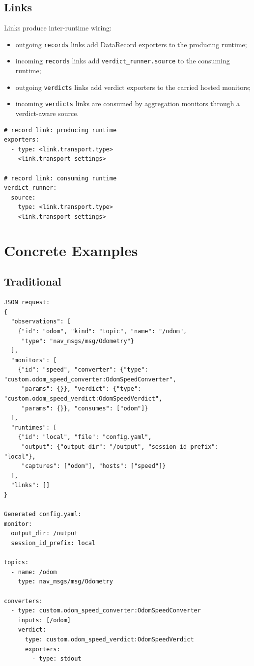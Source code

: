 \documentclass[11pt]{article}
\begin{document}
\subsection{Links}

Links produce inter-runtime wiring:

\begin{itemize}
  \item outgoing \texttt{records} links add DataRecord exporters to the
        producing runtime;
  \item incoming \texttt{records} links add \texttt{verdict\_runner.source}
        to the consuming runtime;
  \item outgoing \texttt{verdicts} links add verdict exporters to the carried
        hosted monitors;
  \item incoming \texttt{verdicts} links are consumed by aggregation monitors
        through a verdict-aware source.
\end{itemize}

\begin{verbatim}
# record link: producing runtime
exporters:
  - type: <link.transport.type>
    <link.transport settings>

# record link: consuming runtime
verdict_runner:
  source:
    type: <link.transport.type>
    <link.transport settings>
\end{verbatim}

\clearpage
\section{Concrete Examples}

\subsection{Traditional}

\begin{verbatim}
JSON request:
{
  "observations": [
    {"id": "odom", "kind": "topic", "name": "/odom",
     "type": "nav_msgs/msg/Odometry"}
  ],
  "monitors": [
    {"id": "speed", "converter": {"type": "custom.odom_speed_converter:OdomSpeedConverter",
     "params": {}}, "verdict": {"type": "custom.odom_speed_verdict:OdomSpeedVerdict",
     "params": {}}, "consumes": ["odom"]}
  ],
  "runtimes": [
    {"id": "local", "file": "config.yaml",
     "output": {"output_dir": "/output", "session_id_prefix": "local"},
     "captures": ["odom"], "hosts": ["speed"]}
  ],
  "links": []
}

Generated config.yaml:
monitor:
  output_dir: /output
  session_id_prefix: local

topics:
  - name: /odom
    type: nav_msgs/msg/Odometry

converters:
  - type: custom.odom_speed_converter:OdomSpeedConverter
    inputs: [/odom]
    verdict:
      type: custom.odom_speed_verdict:OdomSpeedVerdict
      exporters:
        - type: stdout
\end{verbatim}
\end{document}
